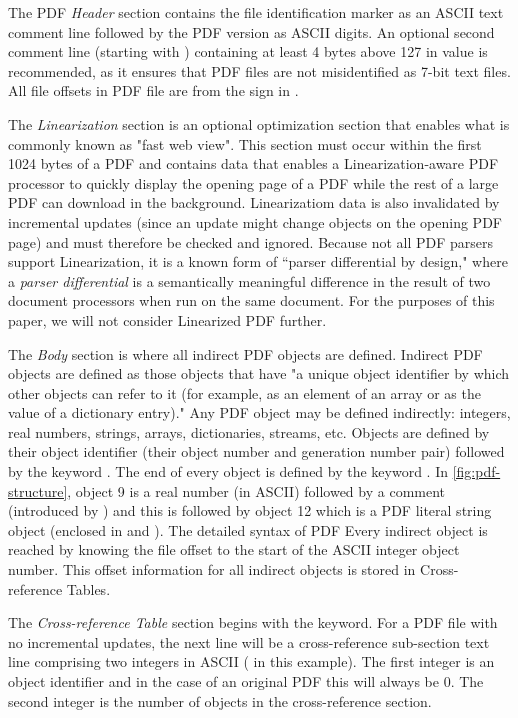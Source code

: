 The PDF \emph{Header} section contains the file identification marker as an ASCII
text comment line  followed by the PDF version as ASCII digits. 
An optional second comment line (starting with \lstcd{\%})
containing at least 4 bytes above 127 in value is recommended, as it ensures 
that PDF files are not misidentified as 7-bit text files. 
All file offsets in PDF file are from the \lstcd{\%} sign in .  

The \emph{Linearization} section is an optional optimization section that enables what is commonly
known as "fast web view". This section must occur within the first 1024 bytes of a PDF and contains
data that enables a Linearization-aware PDF processor to quickly display the opening page of a PDF
while the rest of a large PDF can download in the background.
Linearizatiom data is also invalidated by incremental updates (since an update might change objects
on the opening PDF page) and must therefore be checked and ignored.
%
Because not all PDF parsers support Linearization, it is a known form
of ``parser differential by design," where a \emph{parser
  differential} is a semantically meaningful difference in the result
of two document processors when run on the same document.
%
For the purposes of this paper, we will not consider Linearized PDF further.

The \emph{Body} section is where all indirect PDF objects are defined. Indirect PDF objects
are defined as those objects that have "a unique object identifier by which other objects can
refer to it (for example, as an element of an array or as the value of a dictionary entry)."
Any PDF object may be defined indirectly: integers, real numbers, strings, arrays, dictionaries, 
streams, etc. Objects are defined by their object identifier (their object number and generation 
number pair) followed by the keyword . 
The end of every object is defined by the keyword .
In \cref{fig:pdf-structure}, object 9 is a real number (in ASCII) followed by a comment
(introduced by \lstcd{\%}) and this is followed by object 12 which is a PDF literal string object
(enclosed in \lstcd{(} and \lstcd{)}). The detailed syntax of PDF  
Every indirect object is reached by knowing the file offset to the start of the ASCII integer 
object number. This offset information for all indirect objects is stored in Cross-reference Tables.

The \emph{Cross-reference Table} section begins with the  keyword. For a PDF file
with no incremental updates, the next line will be a cross-reference sub-section text line comprising
two integers in ASCII ( in this example). The first integer is an object identifier 
and in the case of an original PDF this will always be 0. The second integer is the number of
objects in the cross-reference section.

